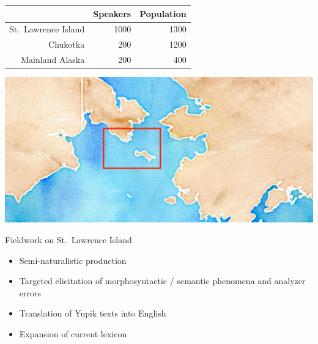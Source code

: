 \documentclass[usenames,dvipsnames]{beamer}
\begin{document}
\begin{frame}[fragile]
\begin{columns}[t]
\begin{column}{0.29\textwidth}
%
\begin{minipage}{0.49\textwidth}
\begin{tabular}{r|r|r|}
\cline{2-3}
 & \scriptsize Speakers & \scriptsize Population \\ \hline
\multicolumn{}{|r|}{\scriptsize St.~Lawrence Island} & \scriptsize 1000 & \scriptsize 1300      \\
\multicolumn{}{|r|}{\scriptsize Chukotka}  &  \scriptsize 200 & \scriptsize 1200      \\
\multicolumn{}{|r|}{\scriptsize Mainland Alaska}    & \scriptsize  200 & \scriptsize  400      \\
\hline
\end{tabular}
\end{minipage}
%
\begin{minipage}{0.49\textwidth}
\includegraphics[scale=0.34]{map-box.jpg}
\end{minipage}%
\vspace{18pt}

\begin{block}{Fieldwork on St.~Lawrence Island}

\begin{itemize}
 \setlength\itemsep{18pt}
        \item Semi-naturalistic production
        
        \item Targeted elicitation of morphosyntactic / semantic phenomena and analyzer errors
        
        \item Translation of Yupik texts into English
        
        \item Expansion of current lexicon

    \end{itemize}
    

\end{block}
\end{column}
\end{columns}
\end{frame}
\end{document}
